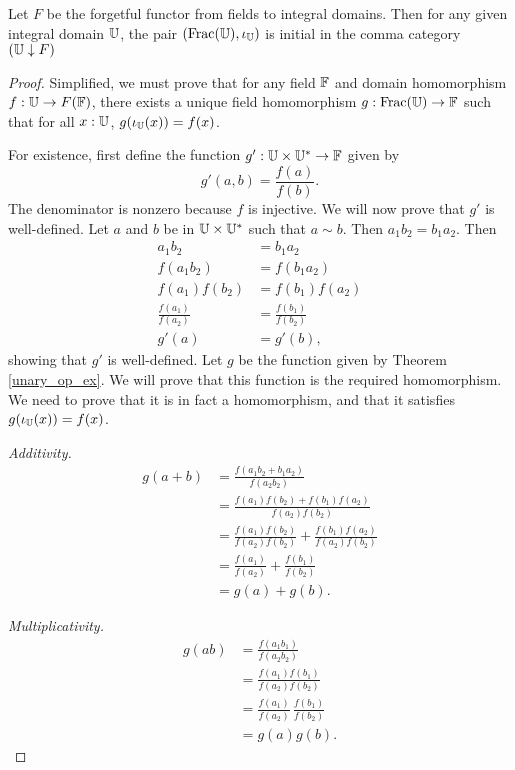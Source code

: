 \documentclass[../../math.tex]{subfiles}
\begin{document}
\begin{theorem}
    Let $F$ be the forgetful functor from fields to integral domains.  Then for
    any given integral domain $\mathbb{U}$, the pair $(\operatorname{Frac}(\mathbb{U}), \iota_{\mathbb{U}})$ is initial
    in the comma category $(\mathbb{U} \downarrow F)$
\end{theorem}
\begin{proof}
    Simplified, we must prove that for any field $\mathbb{F}$ and domain homomorphism $f
    : \mathbb{U} \to F(\mathbb{F})$, there exists a unique field homomorphism $g : \operatorname{Frac}(\mathbb{U}) \to
    \mathbb{F}$ such that for all $x : \mathbb{U}$, $g(\iota_{\mathbb{U}}(x)) = f(x)$.

    For existence, first define the function $g' : \mathbb{U} \times \mathbb{U}^* \to \mathbb{F}$ given
    by
    \[
        g'(a, b) = \frac{f(a)}{f(b)}.
    \]
    The denominator is nonzero because $f$ is injective.  We will now prove that
    $g'$ is well-defined.  Let $a$ and $b$ be in $\mathbb{U} \times \mathbb{U}^*$ such that $a
    \sim b$.  Then $a_1b_2 = b_1a_2$.  Then
    \begin{align*}
        a_1b_2 &= b_1a_2 \\
        f(a_1b_2) &= f(b_1a_2) \\
        f(a_1)f(b_2) &= f(b_1)f(a_2) \\
        \frac{f(a_1)}{f(a_2)} &= \frac{f(b_1)}{f(b_2)} \\
        g'(a) &= g'(b),
    \end{align*}
    showing that $g'$ is well-defined.  Let $g$ be the function given by Theorem
    \ref{unary_op_ex}.  We will prove that this function is the required
    homomorphism.  We need to prove that it is in fact a homomorphism, and that
    it satisfies $g(\iota_{\mathbb{U}}(x)) = f(x)$.

    \textit{Additivity.}
    \begin{align*}
        g(a + b)
        &= \frac{f(a_1b_2 + b_1a_2)}{f(a_2b_2)} \\
        &= \frac{f(a_1)f(b_2) + f(b_1)f(a_2)}{f(a_2)f(b_2)} \\
        &= \frac{f(a_1)f(b_2)}{f(a_2)f(b_2)}
            + \frac{f(b_1)f(a_2)}{f(a_2)f(b_2)} \\
        &= \frac{f(a_1)}{f(a_2)} + \frac{f(b_1)}{f(b_2)} \\
        &= g(a) + g(b).
    \end{align*}

    \textit{Multiplicativity.}
    \begin{align*}
        g(ab)
        &= \frac{f(a_1b_1)}{f(a_2b_2)} \\
        &= \frac{f(a_1)f(b_1)}{f(a_2)f(b_2)} \\
        &= \frac{f(a_1)}{f(a_2)} \, \frac{f(b_1)}{f(b_2)} \\
        &= g(a) g(b).
    \end{align*}


\end{proof}
\end{document}
